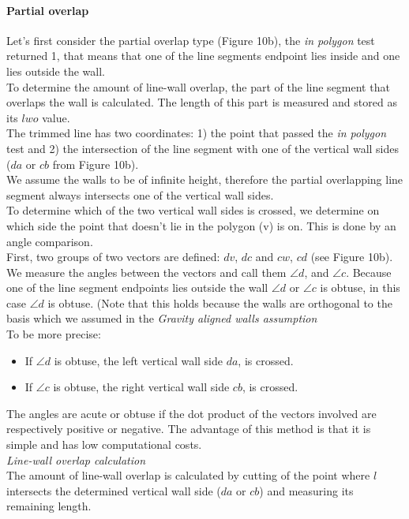 	\paragraph{Partial overlap}
	Let's first consider the partial overlap type (Figure 10b), the \emph{in polygon} test
	returned 1, that means that one of the line segments endpoint lies inside
	and one lies outside the wall.\\
	To determine the amount of line-wall overlap, the part of the line segment
	that overlaps the wall is calculated. The length of this part is measured
	and stored as its $lwo$ value.\\
	The trimmed line has two coordinates: 1) the point that passed
	the \emph{in polygon} test and 2) the intersection of the line
	segment with one of the vertical wall sides ($da$ or $cb$ from Figure 10b).\\
	We assume the walls to be of infinite height, therefore the 
	partial overlapping line segment always intersects one of the
	vertical wall sides.\\
	To determine which of the two vertical wall sides is crossed, we determine
	on which side the point that doesn't lie in the polygon (v) is on.  This is
	done by an angle comparison.\\
	First, two groups of two vectors are defined: $dv$, $dc$ and $cw$, $cd$ (see Figure 10b).
	We measure the angles between the vectors and call them $\angle d$, and
	$\angle c$. 
	Because one of the line segment endpoints lies outside
	the wall $\angle d$ or $\angle c$ is obtuse, in this case $\angle d$ is obtuse.
	(Note that this holds because the walls are orthogonal to the basis
	which we assumed in the \emph{Gravity aligned walls assumption}\\
	To be more precise: 
	\begin{itemize}
	\item If $\angle d$ is obtuse, the left vertical wall side $da$, is
	crossed. \\
	\item If $\angle c$ is obtuse, the right vertical wall side $cb$, is
	crossed. \\
	\end{itemize}
	The angles are acute or obtuse if the dot product of the vectors involved
	are respectively positive or negative. The advantage of this method is that
	it is simple and has low computational costs.\\
	
	\emph{Line-wall overlap calculation}\\
	The amount of line-wall overlap is calculated by cutting of the
	point where $l$ intersects the determined vertical wall side ($da$ or
	$cb$) and measuring its remaining length.\\


